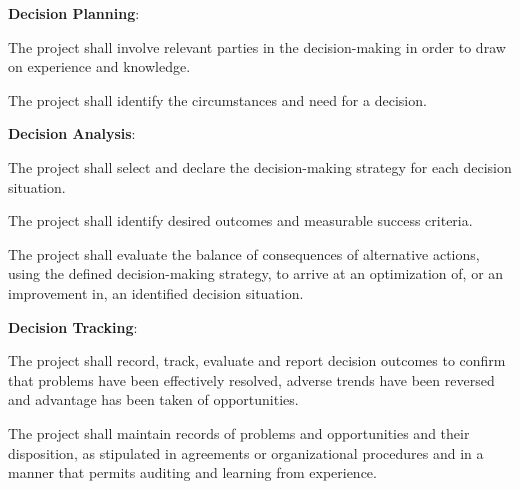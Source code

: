 			\begin{adjustwidth}{2em}{0pt} 

				\begin{compactenum}

					\item {\bf Decision Planning}:
					\begin{compactenum}

						\item The project shall involve relevant parties in the decision-making in order to draw on experience and knowledge.

						\item The project shall identify the circumstances and need for a decision.

					\end{compactenum}

					\item {\bf Decision Analysis}:
					\begin{compactenum}

						\item The project shall select and declare the decision-making strategy for each decision situation. 

						\item The project shall identify desired outcomes and measurable success criteria.
						
						\item The project shall evaluate the balance of consequences of alternative actions, using the defined decision-making strategy, to arrive at an optimization of, or an improvement in, an identified decision situation.

					\end{compactenum}

					\item {\bf Decision Tracking}:
					\begin{compactenum}

						\item The project shall record, track, evaluate and report decision outcomes to confirm that problems have been effectively resolved, adverse trends have been reversed and advantage has been taken of opportunities.

						\item The project shall maintain records of problems and opportunities and their disposition, as stipulated in agreements or organizational procedures and in a manner that permits auditing and learning from experience.
						
					\end{compactenum}

				\end{compactenum}

			\end{adjustwidth}

